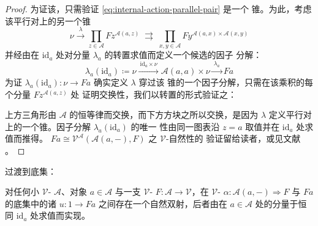 \begin{proof}
为证该\trIsomorphism，只需验证 \eqref{eq:internal-action-parallel-pair} 是一个%
\trLimit{}锥。为此，考虑该平行对上的另一个锥
\[ \nu\xrightarrow{\ \lambda\ }\prod_{z\in\mathcal{A}}Fz^{\mathcal{A}(a,z)}
   \;\rightrightarrows\;
   \prod_{x,y\in\mathcal{A}}Fy^{\mathcal{A}(a,x)\times\mathcal{A}(x,y)} \]
并经由在 $\mathrm{id}_{a}$ 处对分量 $\lambda_{a}$ 的转置求值而定义一个候选的因子
分解：
\[ \lambda_{a}(\mathrm{id}_{a})\coloneqq\nu
   \xrightarrow{\ \mathrm{id}_{a}\times\nu\ }\mathcal{A}(a,a)\times\nu
   \xrightarrow{\ \lambda_{a}\ }Fa \]
为证 $\lambda_{a}(\mathrm{id}_{a})\colon\nu\to Fa$ 确实定义 $\lambda$ 穿过该%
\trLimit{}锥的一个因子分解，只需在该乘积的每个分量 $Fz^{\mathcal{A}(a,z)}$ 处
证明交换性，我们以转置的形式验证之：
\begin{center}
\end{center}
上方三角形由 $\mathcal{A}$ 的恒等律而交换，而下方方块之所以交换，是因为
$\lambda$ 定义平行对上的一个锥。因子分解 $\lambda_{a}(\mathrm{id}_{a})$ 的唯一
性由同一图表沿 $z=a$ 取值并在 $\mathrm{id}_{a}$ 处求值而推得。
$Fa\cong\mathcal{V}^{\mathcal{A}}(\mathcal{A}(a,-),F)$ 之 $\mathcal{V}$-自然性的
验证留给读者，或见文献 \cite[\S 2.4]{bib68}。
\end{proof}

过渡到底集：

\begin{corollary}\label{cor:yoneda-bijection}
对任何小 $\mathcal{V}$-\trCategory{} $\mathcal{A}$、对象 $a\in\mathcal{A}$ 与一支
$\mathcal{V}$-\trFunctor{} $F\colon\mathcal{A}\to\mathcal{V}$，在
$\mathcal{V}$-\trNaturalTransformation{} $\alpha\colon\mathcal{A}(a,-)\Rightarrow F$
与 $Fa$ 的底集中的诸\trElement{} $u\colon 1\to Fa$ 之间存在一个自然双射，后者由在
$a\in\mathcal{A}$ 处的分量于恒同 $\mathrm{id}_{a}$ 处求值而实现。
\end{corollary}

